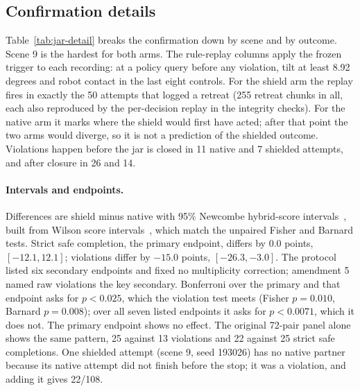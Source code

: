 \subsection{Confirmation details}\label{app:jar-confirm}
Table~\ref{tab:jar-detail} breaks the confirmation down by scene and by
outcome. Scene 9 is the hardest for both arms. The rule-replay columns
apply the frozen trigger to each recording: at a policy query before any
violation, tilt at least 8.92 degrees and robot contact in the last eight
controls. For the shield arm the replay fires in exactly the 50 attempts that logged a
retreat (255 retreat chunks in all, each also reproduced by the per-decision
replay in the integrity checks). For the native arm it marks where the shield
would first have acted; after that point the two arms would diverge, so it
is not a prediction of the shielded outcome. Violations happen before the jar
is closed in 11 native and 7 shielded attempts, and after closure in 26 and 14.

\paragraph{Intervals and endpoints.} Differences are shield minus native with
95\% Newcombe hybrid-score intervals~\cite{newcombe1998interval}, built
from Wilson score intervals~\cite{wilson1927probable}, which
match the unpaired Fisher and Barnard tests. Strict safe completion, the
primary endpoint, differs by 0.0 points, $[-12.1,12.1]$; violations differ by
$-15.0$ points, $[-26.3,-3.0]$. The protocol listed six secondary endpoints and fixed no multiplicity
correction; amendment 5 named raw violations the key secondary. Bonferroni
over the primary and that endpoint asks for $p<0.025$, which the violation
test meets (Fisher $p=0.010$, Barnard $p=0.008$); over all seven listed
endpoints it asks for $p<0.0071$, which it does not. The primary endpoint
shows no effect. The original 72-pair panel alone shows the same pattern, 25
against 13 violations and 22 against 25 strict safe completions. One shielded
attempt (scene 9, seed 193026) has no native partner because its native
attempt did not finish before the stop; it was a violation, and adding it gives 22/108.

